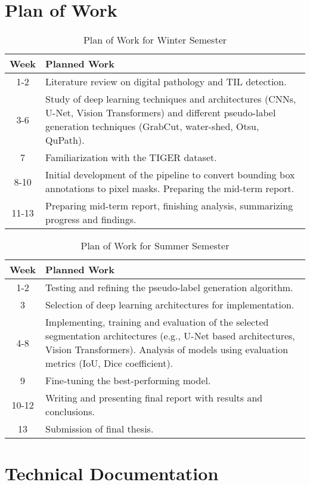 \setcounter{figure}{0}
\setcounter{listing}{0}

\chapter{Plan of Work \label{appendix:plan} }
\renewcommand{\thepage}{A-\arabic{page}}
\setcounter{page}{1}

\begin{table}[h!]
\centering
\begin{tabular}{|c|p{12.5cm}|}
\hline
\textbf{Week} & \textbf{Planned Work} \\ 
\hline
\hline
1-2 & Literature review on digital pathology and TIL detection. \\ 
\hline
3-6 & Study of deep learning techniques and architectures (CNNs, U-Net, Vision Transformers) and different pseudo-label generation techniques (GrabCut, water-shed, Otsu, QuPath). \\
\hline
7 & Familiarization with the TIGER dataset. \\
\hline
8-10 & Initial development of the pipeline to convert bounding box annotations to pixel masks. Preparing the mid-term report. \\ 
\hline
11-13 & Preparing mid-term report, finishing analysis, summarizing progress and findings. \\ 
\hline
\end{tabular}
\caption{Plan of Work for Winter Semester}
\label{tab:winter_plan}
\end{table}

\begin{table}[h!]
\centering
\begin{tabular}{|c|p{12.5cm}|}
\hline
\textbf{Week} & \textbf{Planned Work} \\ 
\hline
\hline
1-2 & Testing and refining the pseudo-label generation algorithm. \\
\hline
3 & Selection of deep learning architectures for implementation. \\ 
\hline
4-8 & Implementing, training and evaluation of the selected segmentation architectures (e.g., U-Net based architectures, Vision Transformers). Analysis of models using evaluation metrics (IoU, Dice coefficient). \\ 
\hline
9 & Fine-tuning the best-performing model. \\ 
\hline
10-12 & Writing and presenting final report with results and conclusions. \\ 
\hline
13 & Submission of final thesis. \\ 
\hline
\end{tabular}
\caption{Plan of Work for Summer Semester}
\label{tab:summer_plan}
\end{table}

\chapter{Technical Documentation \label{appendix:td} }